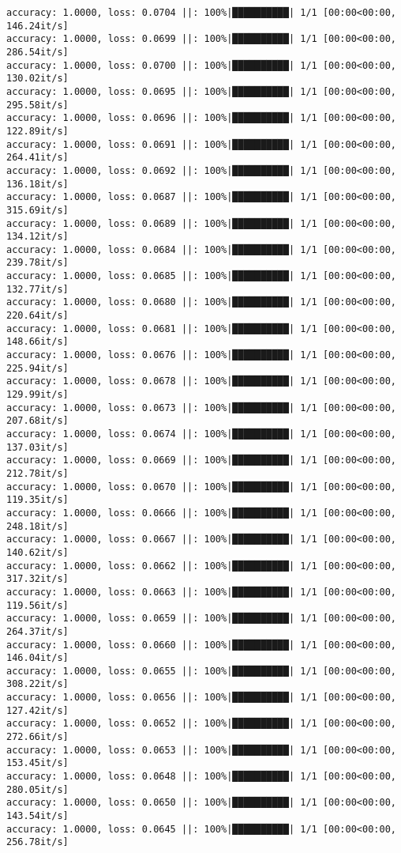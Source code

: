 \documentclass[
]{article}
\begin{document}
\begin{verbatim}
accuracy: 1.0000, loss: 0.0704 ||: 100%|██████████| 1/1 [00:00<00:00, 146.24it/s]
accuracy: 1.0000, loss: 0.0699 ||: 100%|██████████| 1/1 [00:00<00:00, 286.54it/s]
accuracy: 1.0000, loss: 0.0700 ||: 100%|██████████| 1/1 [00:00<00:00, 130.02it/s]
accuracy: 1.0000, loss: 0.0695 ||: 100%|██████████| 1/1 [00:00<00:00, 295.58it/s]
accuracy: 1.0000, loss: 0.0696 ||: 100%|██████████| 1/1 [00:00<00:00, 122.89it/s]
accuracy: 1.0000, loss: 0.0691 ||: 100%|██████████| 1/1 [00:00<00:00, 264.41it/s]
accuracy: 1.0000, loss: 0.0692 ||: 100%|██████████| 1/1 [00:00<00:00, 136.18it/s]
accuracy: 1.0000, loss: 0.0687 ||: 100%|██████████| 1/1 [00:00<00:00, 315.69it/s]
accuracy: 1.0000, loss: 0.0689 ||: 100%|██████████| 1/1 [00:00<00:00, 134.12it/s]
accuracy: 1.0000, loss: 0.0684 ||: 100%|██████████| 1/1 [00:00<00:00, 239.78it/s]
accuracy: 1.0000, loss: 0.0685 ||: 100%|██████████| 1/1 [00:00<00:00, 132.77it/s]
accuracy: 1.0000, loss: 0.0680 ||: 100%|██████████| 1/1 [00:00<00:00, 220.64it/s]
accuracy: 1.0000, loss: 0.0681 ||: 100%|██████████| 1/1 [00:00<00:00, 148.66it/s]
accuracy: 1.0000, loss: 0.0676 ||: 100%|██████████| 1/1 [00:00<00:00, 225.94it/s]
accuracy: 1.0000, loss: 0.0678 ||: 100%|██████████| 1/1 [00:00<00:00, 129.99it/s]
accuracy: 1.0000, loss: 0.0673 ||: 100%|██████████| 1/1 [00:00<00:00, 207.68it/s]
accuracy: 1.0000, loss: 0.0674 ||: 100%|██████████| 1/1 [00:00<00:00, 137.03it/s]
accuracy: 1.0000, loss: 0.0669 ||: 100%|██████████| 1/1 [00:00<00:00, 212.78it/s]
accuracy: 1.0000, loss: 0.0670 ||: 100%|██████████| 1/1 [00:00<00:00, 119.35it/s]
accuracy: 1.0000, loss: 0.0666 ||: 100%|██████████| 1/1 [00:00<00:00, 248.18it/s]
accuracy: 1.0000, loss: 0.0667 ||: 100%|██████████| 1/1 [00:00<00:00, 140.62it/s]
accuracy: 1.0000, loss: 0.0662 ||: 100%|██████████| 1/1 [00:00<00:00, 317.32it/s]
accuracy: 1.0000, loss: 0.0663 ||: 100%|██████████| 1/1 [00:00<00:00, 119.56it/s]
accuracy: 1.0000, loss: 0.0659 ||: 100%|██████████| 1/1 [00:00<00:00, 264.37it/s]
accuracy: 1.0000, loss: 0.0660 ||: 100%|██████████| 1/1 [00:00<00:00, 146.04it/s]
accuracy: 1.0000, loss: 0.0655 ||: 100%|██████████| 1/1 [00:00<00:00, 308.22it/s]
accuracy: 1.0000, loss: 0.0656 ||: 100%|██████████| 1/1 [00:00<00:00, 127.42it/s]
accuracy: 1.0000, loss: 0.0652 ||: 100%|██████████| 1/1 [00:00<00:00, 272.66it/s]
accuracy: 1.0000, loss: 0.0653 ||: 100%|██████████| 1/1 [00:00<00:00, 153.45it/s]
accuracy: 1.0000, loss: 0.0648 ||: 100%|██████████| 1/1 [00:00<00:00, 280.05it/s]
accuracy: 1.0000, loss: 0.0650 ||: 100%|██████████| 1/1 [00:00<00:00, 143.54it/s]
accuracy: 1.0000, loss: 0.0645 ||: 100%|██████████| 1/1 [00:00<00:00, 256.78it/s]

\end{verbatim}
\end{document}
